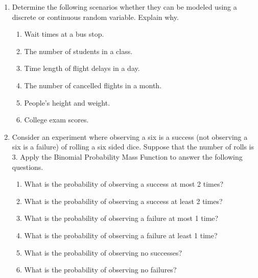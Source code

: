 \documentclass[
]{article}
\providecommand{\tightlist}{%
  \setlength{\itemsep}{0pt}\setlength{\parskip}{0pt}}
\begin{document}
\begin{enumerate}
\def\labelenumi{\arabic{enumi}.}
\item
  Determine the following scenarios whether they can be modeled using a discrete or continuous random variable. Explain why.

  \begin{enumerate}
  \def\labelenumii{\alph{enumii}.}
  \tightlist
  \item
    Wait times at a bus stop.
  \item
    The number of students in a class.
  \item
    Time length of flight delays in a day.
  \item
    The number of cancelled flights in a month.
  \item
    People's height and weight.
  \item
    College exam scores.
  \end{enumerate}
\item
  Consider an experiment where observing a six is a success (not observing a six is a failure) of rolling a six sided dice. Suppose that the number of rolls is 3. Apply the Binomial Probability Mass Function to answer the following questions.

  \begin{enumerate}
  \def\labelenumii{\alph{enumii}.}
  \tightlist
  \item
    What is the probability of observing a success at most 2 times?
  \item
    What is the probability of observing a success at least 2 times?
  \item
    What is the probability of observing a failure at most 1 time?
  \item
    What is the probability of observing a failure at least 1 time?
  \item
    What is the probability of observing no successes?
  \item
    What is the probability of observing no failures?
  \end{enumerate}
\end{enumerate}
\end{document}
